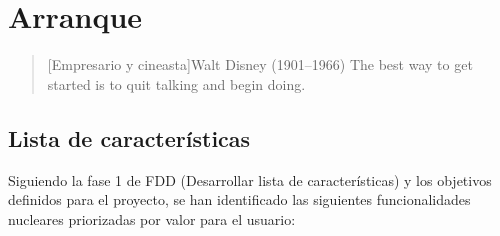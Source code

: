 \chapter{Arranque}

\begin{quotation}[Empresario y cineasta]{Walt Disney (1901--1966)}
The best way to get started is to quit talking and begin doing.
\end{quotation}

\begin{abstract}
Este capítulo define la lista inicial de características priorizadas del proyecto Scubex y, a partir de ellas, la arquitectura base necesaria para soportarlas. Se sigue el orden natural del ciclo FDD: primero se establece qué se va a construir, y solo entonces se diseña cómo.
\end{abstract}

\section{Lista de características}

Siguiendo la fase 1 de FDD (Desarrollar lista de características) y los objetivos definidos para el proyecto, se han identificado las siguientes funcionalidades nucleares priorizadas por valor para el usuario:

